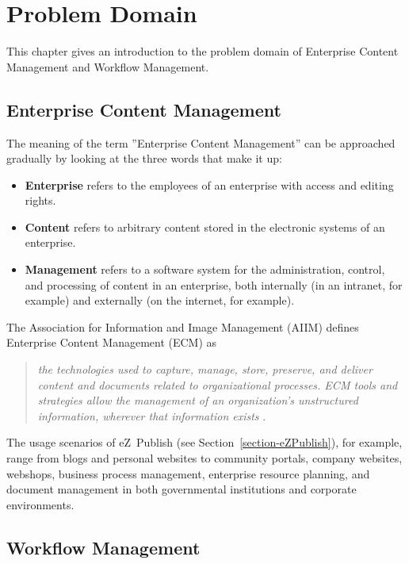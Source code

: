 \chapter{Problem Domain}
\label{chapter-ProblemDomain}

This chapter gives an introduction to the problem domain of Enterprise Content
Management and Workflow Management.

\section{Enterprise Content Management}

The meaning of the term ''Enterprise Content Management'' can be approached
gradually by looking at the three words that make it up:

\begin{itemize}
\item \textbf{Enterprise} refers to the employees of an enterprise with access
      and editing rights.
\item \textbf{Content} refers to arbitrary content stored in the electronic
      systems of an enterprise.
\item \textbf{Management} refers to a software system for the administration,
      control, and processing of content in an enterprise, both internally
      (in an intranet, for example) and externally (on the internet, for
      example).
\end{itemize}

The Association for Information and Image Management (AIIM) defines
Enterprise Content Management (ECM) as

\begin{quote}
\emph{the technologies used to capture, manage, store, preserve, and deliver
content and documents related to organizational processes. ECM tools and
strategies allow the management of an organization's unstructured information,
wherever that information exists} \cite{AIIM}.
\end{quote}

The usage scenarios of eZ~Publish (see Section~\ref{section-eZPublish}), for
example, range from blogs and personal websites to community portals, company
websites, webshops, business process management, enterprise resource planning,
and document management in both governmental institutions and corporate
environments.

\section{Workflow Management}

